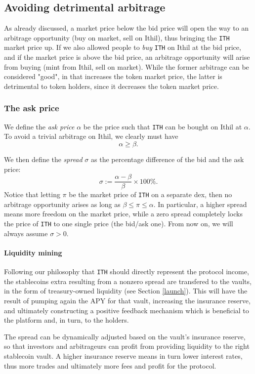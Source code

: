 \documentclass[a4paper,10 pt]{article}
\theoremstyle{definition}
\begin{document}
\subsection{Avoiding detrimental arbitrage}

As already discussed, a market price below the bid price will open the way to an arbitrage opportunity (buy on market, sell on Ithil), thus bringing the \verb|ITH| market price up. If we also allowed people to {\it buy} \verb|ITH| on Ithil at the bid price, and if the market price is above the bid price, an arbitrage opportunity will arise from buying (mint from Ithil, sell on market). While the former arbitrage can be considered "good", in that increases the token market price, the latter is detrimental to token holders, since it decreases the token market price.

\subsubsection{The ask price}
We define the {\it ask price} $\alpha$ be the price such that \verb|ITH| can be bought on Ithil at $\alpha$. To avoid a trivial arbitrage on Ithil, we clearly must have $$\alpha \ge \beta.$$

We then define the {\it spread} $\sigma$ as the percentage difference of the bid and the ask price: $$\sigma := \frac{\alpha-\beta}{\beta} \times 100\%.$$
Notice that letting $\pi$ be the market price of \verb|ITH| on a separate dex, then no arbitrage opportunity arises as long as $\beta \le \pi \le \alpha$. In particular, a higher spread means more freedom on the market price, while a zero spread completely locks the price of \verb|ITH| to one single price (the bid/ask one).  From now on, we will always assume $\sigma > 0$.

\paragraph{Liquidity mining}
Following our philosophy that \verb|ITH| should directly represent the protocol income, the stablecoins extra resulting from a nonzero spread are transfered to the vaults, in the form of treasury-owned liquidity (see Section \ref{launch}). This will have the result of pumping again the APY for that vault, increasing the insurance reserve, and ultimately constructing a positive feedback mechanism which is beneficial to the platform and, in turn, to the holders.

The spread can be dynamically adjusted based on the vault's insurance reserve, so that investors and arbitrageurs can profit from providing liquidity to the right stablecoin vault. A higher insurance reserve means in turn lower interest rates, thus more trades and ultimately more fees and profit for the protocol.
\end{document}
